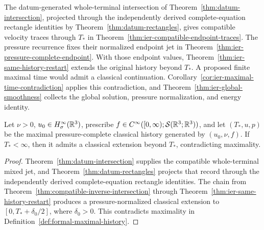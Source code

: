 The datum-generated whole-terminal intersection of
Theorem~\ref{thm:datum-intersection}, projected through the independently
derived complete-equation rectangle identities by
Theorem~\ref{thm:datum-rectangles}, gives compatible velocity traces through \(T_*\) in
Theorem~\ref{thm:ier-compatible-endpoint-traces}.  The pressure
recurrence fixes their normalized endpoint jet in
Theorem~\ref{thm:ier-pressure-complete-endpoint}.  With those endpoint
values, Theorem~\ref{thm:ier-same-history-restart} extends the original
history beyond \(T_*\).  A proposed finite maximal time would admit a
classical continuation.  Corollary~\ref{cor:ier-maximal-time-contradiction}
applies this contradiction, and Theorem~\ref{thm:ier-global-smoothness}
collects the global solution, pressure normalization, and energy identity.

\begin{corollary}
\label{cor:ier-maximal-time-contradiction}
Let \(\nu>0\), \(u_0\in H^\infty_\sigma(\mathbb R^3)\), prescribe
\(f\in C^\infty([0,\infty);\mathcal S(\mathbb R^3;\mathbb R^3))\), and let
\((T_*,u,p)\) be the maximal pressure-complete classical history generated
by \((u_0,\nu,f)\).  If \(T_*<\infty\), then it admits a classical extension
beyond \(T_*\), contradicting maximality.
\end{corollary}

\begin{proof}
Theorem~\ref{thm:datum-intersection} supplies the compatible
whole-terminal mixed jet, and Theorem~\ref{thm:datum-rectangles} projects that
record through the independently derived complete-equation rectangle
identities.  The chain from
Theorem~\ref{thm:compatible-inverse-intersection} through
Theorem~\ref{thm:ier-same-history-restart} produces a pressure-normalized classical
extension to \([0,T_*+\delta_0/2]\), where \(\delta_0>0\).  This contradicts
maximality in Definition~\ref{def:formal-maximal-history}.
\end{proof}

